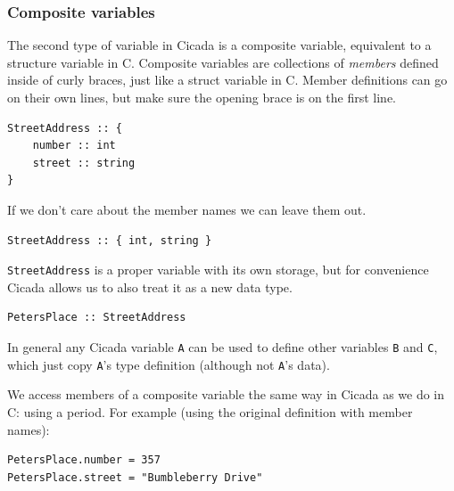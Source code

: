 \documentclass{article}
\newenvironment{code}{
       \begin{list}{}{
               \setlength{\leftmargin}{.4in}
               \setlength{\rightmargin}{0in}
               \setlength{\topsep}{.2in}
       }
       \small
       \item[] }
       { \end{list}   }
\begin{document}
\subsubsection{Composite variables}

  The second type of variable in Cicada is a composite variable, equivalent to a structure variable in C.  Composite variables are collections of \emph{members} defined inside of curly braces, just like a struct variable in C.  Member definitions can go on their own lines, but make sure the opening brace is on the first line.

\begin{code} \begin{verbatim}
StreetAddress :: {
    number :: int
    street :: string
}
\end{verbatim} \end{code}

\noindent If we don't care about the member names we can leave them out.

\begin{code} \begin{verbatim}
StreetAddress :: { int, string }
\end{verbatim} \end{code}

\noindent \verb#StreetAddress# is a proper variable with its own storage, but for convenience Cicada allows us to also treat it as a new data type.

\begin{code} \begin{verbatim}
PetersPlace :: StreetAddress
\end{verbatim} \end{code}

\noindent In general any Cicada variable \verb#A# can be used to define other variables \verb#B# and \verb#C#, which just copy \verb#A#'s type definition (although not \verb#A#'s data).

We access members of a composite variable the same way in Cicada as we do in C:  using a period.  For example (using the original definition with member names):

\begin{code} \begin{verbatim}
PetersPlace.number = 357
PetersPlace.street = "Bumbleberry Drive"
\end{verbatim} \end{code}
\end{document}
